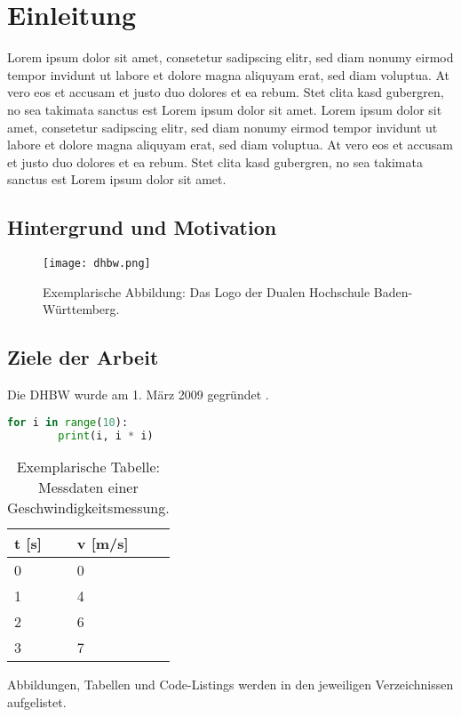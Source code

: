 
\chapter{Einleitung}

Lorem ipsum dolor sit amet, consetetur sadipscing elitr, sed diam nonumy eirmod tempor invidunt ut labore et dolore magna aliquyam erat, sed diam voluptua. At vero eos et accusam et justo duo dolores et ea rebum. Stet clita kasd gubergren, no sea takimata sanctus est Lorem ipsum dolor sit amet. Lorem ipsum dolor sit amet, consetetur sadipscing elitr, sed diam nonumy eirmod tempor invidunt ut labore et dolore magna aliquyam erat, sed diam voluptua. At vero eos et accusam et justo duo dolores et ea rebum. Stet clita kasd gubergren, no sea takimata sanctus est Lorem ipsum dolor sit amet.

\section{Hintergrund und Motivation}

\begin{figure}[ht]
    \centering
    \texttt{[image: dhbw.png]}
    \caption{Exemplarische Abbildung: Das Logo der Dualen Hochschule Baden-Württemberg.}
\end{figure}

\section{Ziele der Arbeit}

Die \ac{DHBW} wurde am 1. März 2009 gegründet \cite{DHBW-wirueberuns}.

\begin{minipage}{\linewidth}
    \begin{lstlisting}[language=Python, caption={Exemplarisches Code-Listing: Einfache for-Schleife mit Konsolenausgabe.}]
    for i in range(10):
        print(i, i * i)
    \end{lstlisting}
\end{minipage}

\begin{table}[ht]
    \centering
    \begin{tabular}{|l|l|}
        \hline
        t {[}s{]} & v {[}m/s{]} \\ \hline
        0         & 0           \\ \hline
        1         & 4           \\ \hline
        2         & 6           \\ \hline
        3         & 7           \\ \hline
    \end{tabular}
    \caption{Exemplarische Tabelle: Messdaten einer Geschwindigkeitsmessung.}
\end{table}

Abbildungen, Tabellen und Code-Listings werden in den jeweiligen Verzeichnissen aufgelistet.